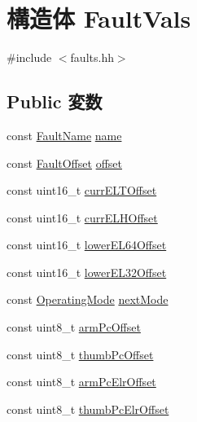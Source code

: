 \hypertarget{structArmISA_1_1ArmFault_1_1FaultVals}{
\section{構造体 FaultVals}
\label{structArmISA_1_1ArmFault_1_1FaultVals}
}


{\ttfamily \#include $<$faults.hh$>$}\subsection*{Public 変数}
\begin{DoxyCompactItemize}
\item 
const \hyperlink{sim_2faults_8hh_abb196df64725e5c2568c900cf130d8d7}{FaultName} \hyperlink{structArmISA_1_1ArmFault_1_1FaultVals_a4d488474632193509a5a7521b4cf58f4}{name}
\item 
const \hyperlink{classm5_1_1params_1_1Addr}{FaultOffset} \hyperlink{structArmISA_1_1ArmFault_1_1FaultVals_a778d3e813933a076bcd9c3773adaef95}{offset}
\item 
const uint16\_\-t \hyperlink{structArmISA_1_1ArmFault_1_1FaultVals_a201c56b49cd63876dacfbe37eede7d95}{currELTOffset}
\item 
const uint16\_\-t \hyperlink{structArmISA_1_1ArmFault_1_1FaultVals_a0d0fdf0ed32354c5bfd96838287a4e8b}{currELHOffset}
\item 
const uint16\_\-t \hyperlink{structArmISA_1_1ArmFault_1_1FaultVals_a63f9ce93412f04583c03ea1481359a69}{lowerEL64Offset}
\item 
const uint16\_\-t \hyperlink{structArmISA_1_1ArmFault_1_1FaultVals_a6b2d7282702ab76c1e7ba88c5f36276c}{lowerEL32Offset}
\item 
const \hyperlink{namespaceArmISA_ae306b3353ed3d62bb2e6de130b3c9eaa}{OperatingMode} \hyperlink{structArmISA_1_1ArmFault_1_1FaultVals_a2c7f4a024af107179bac9ac9100058b9}{nextMode}
\item 
const uint8\_\-t \hyperlink{structArmISA_1_1ArmFault_1_1FaultVals_a355dadd1b099bfae6d6290258826775d}{armPcOffset}
\item 
const uint8\_\-t \hyperlink{structArmISA_1_1ArmFault_1_1FaultVals_a549b30d126a28b4535bf031131fd30c2}{thumbPcOffset}
\item 
const uint8\_\-t \hyperlink{structArmISA_1_1ArmFault_1_1FaultVals_a0f842dcb4caa04a34edfd154a6b4cf80}{armPcElrOffset}
\item 
const uint8\_\-t \hyperlink{structArmISA_1_1ArmFault_1_1FaultVals_ad765db0a66a03c467f5e537b0131c98a}{thumbPcElrOffset}

\end{DoxyCompactItemize}
